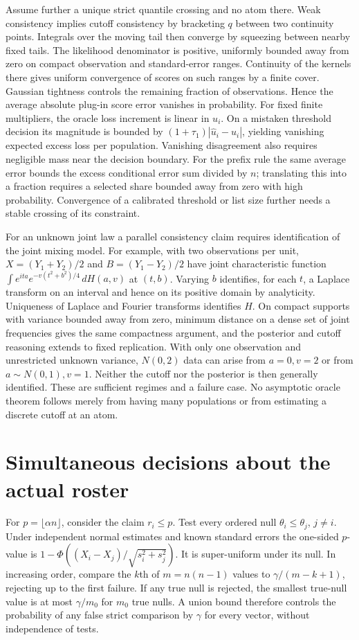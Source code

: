 \documentclass[11pt]{article}
\begin{document}
Assume further a unique strict quantile crossing and no atom there. Weak consistency implies cutoff consistency by bracketing $q$ between two continuity points. Integrals over the moving tail then converge by squeezing between nearby fixed tails. The likelihood denominator is positive, uniformly bounded away from zero on compact observation and standard-error ranges. Continuity of the kernels there gives uniform convergence of scores on such ranges by a finite cover. Gaussian tightness controls the remaining fraction of observations. Hence the average absolute plug-in score error vanishes in probability. For fixed finite multipliers, the oracle loss increment is linear in $u_i$. On a mistaken threshold decision its magnitude is bounded by $(1+\tau_1)|\hat u_i-u_i|$, yielding vanishing expected excess loss per population. Vanishing disagreement also requires negligible mass near the decision boundary. For the prefix rule the same average error bounds the excess conditional error sum divided by $n$; translating this into a fraction requires a selected share bounded away from zero with high probability. Convergence of a calibrated threshold or list size further needs a stable crossing of its constraint.

For an unknown joint law a parallel consistency claim requires identification of the joint mixing model. For example, with two observations per unit, $X=(Y_1+Y_2)/2$ and $B=(Y_1-Y_2)/2$ have joint characteristic function $\int e^{ita}e^{-v(t^2+b^2)/4}\,dH(a,v)$ at $(t,b)$. Varying $b$ identifies, for each $t$, a Laplace transform on an interval and hence on its positive domain by analyticity. Uniqueness of Laplace and Fourier transforms identifies $H$. On compact supports with variance bounded away from zero, minimum distance on a dense set of joint frequencies gives the same compactness argument, and the posterior and cutoff reasoning extends to fixed replication. With only one observation and unrestricted unknown variance, $N(0,2)$ data can arise from $a=0,v=2$ or from $a\sim N(0,1),v=1$. Neither the cutoff nor the posterior is then generally identified. These are sufficient regimes and a failure case. No asymptotic oracle theorem follows merely from having many populations or from estimating a discrete cutoff at an atom.

\section{Simultaneous decisions about the actual roster}
For $p=\lfloor\alpha n\rfloor$, consider the claim $r_i\le p$. Test every ordered null $\theta_i\le\theta_j$, $j\ne i$. Under independent normal estimates and known standard errors the one-sided $p$-value is $1-\Phi((X_i-X_j)/\sqrt{s_i^2+s_j^2})$. It is super-uniform under its null. In increasing order, compare the $k$th of $m=n(n-1)$ values to $\gamma/(m-k+1)$, rejecting up to the first failure. If any true null is rejected, the smallest true-null value is at most $\gamma/m_0$ for $m_0$ true nulls. A union bound therefore controls the probability of any false strict comparison by $\gamma$ for every vector, without independence of tests.
\end{document}
